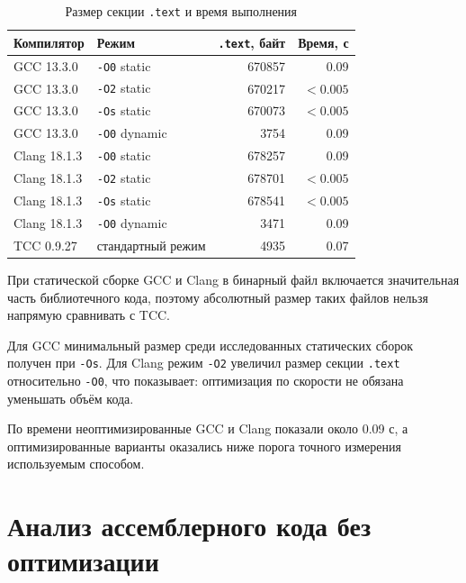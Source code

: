 \documentclass[12pt,a4paper]{article}
\begin{document}
\begin{table}[H]
\centering
\caption{Размер секции \texttt{.text} и время выполнения}
\begin{tabular}{llrr}
\toprule
Компилятор & Режим & \texttt{.text}, байт & Время, с \\
\midrule
GCC 13.3.0 & \texttt{-O0} static & 670857 & 0.09 \\
GCC 13.3.0 & \texttt{-O2} static & 670217 & $<0.005$ \\
GCC 13.3.0 & \texttt{-Os} static & 670073 & $<0.005$ \\
GCC 13.3.0 & \texttt{-O0} dynamic & 3754 & 0.09 \\
Clang 18.1.3 & \texttt{-O0} static & 678257 & 0.09 \\
Clang 18.1.3 & \texttt{-O2} static & 678701 & $<0.005$ \\
Clang 18.1.3 & \texttt{-Os} static & 678541 & $<0.005$ \\
Clang 18.1.3 & \texttt{-O0} dynamic & 3471 & 0.09 \\
TCC 0.9.27 & стандартный режим & 4935 & 0.07 \\
\bottomrule
\end{tabular}
\end{table}

При статической сборке GCC и Clang в бинарный файл включается значительная часть библиотечного кода, поэтому абсолютный размер таких файлов нельзя напрямую сравнивать с TCC.

Для GCC минимальный размер среди исследованных статических сборок получен при \texttt{-Os}. Для Clang режим \texttt{-O2} увеличил размер секции \texttt{.text} относительно \texttt{-O0}, что показывает: оптимизация по скорости не обязана уменьшать объём кода.

По времени неоптимизированные GCC и Clang показали около 0.09 с, а оптимизированные варианты оказались ниже порога точного измерения используемым способом.

\section{Анализ ассемблерного кода без оптимизации}
\end{document}
